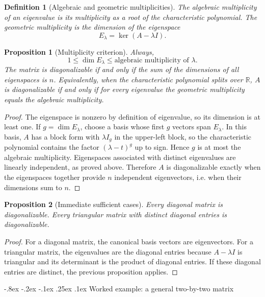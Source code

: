 \documentclass[10pt]{article}
\makeatletter
\renewcommand\subsubsection{\@startsection{subsubsection}{3}{\z@}%
  {-.8ex \@plus -.2ex \@minus -.1ex}%
  {.25ex \@plus .1ex}%
  {\normalfont\normalsize\bfseries\itshape}}
\theoremstyle{compactdefinition}
\newtheorem{definition}{Definition}[section]
\theoremstyle{compactproposition}
\newtheorem{proposition}{Proposition}[section]
\newcommand{\R}{\mathbb{R}}
\makeatother
\begin{document}
\begin{definition}[Algebraic and geometric multiplicities]
The algebraic multiplicity of an eigenvalue is its multiplicity as a root of
the characteristic polynomial. The geometric multiplicity is the dimension of
the eigenspace
\[
E_\lambda=\ker(A-\lambda I).
\]
\end{definition}

\begin{proposition}[Multiplicity criterion]
Always,
\[
1\le \dim E_\lambda\le \text{algebraic multiplicity of }\lambda.
\]
The matrix is diagonalizable if and only if the sum of the dimensions of all
eigenspaces is $n$. Equivalently, when the characteristic polynomial splits
over $\R$, $A$ is diagonalizable if and only if for every eigenvalue the
geometric multiplicity equals the algebraic multiplicity.
\end{proposition}

\begin{proof}
The eigenspace is nonzero by definition of eigenvalue, so its dimension is at
least one. If $g=\dim E_\lambda$, choose a basis whose first $g$ vectors span
$E_\lambda$. In this basis, $A$ has a block form with $\lambda I_g$ in the
upper-left block, so the characteristic polynomial contains the factor
$(\lambda-t)^g$ up to sign. Hence $g$ is at most the algebraic multiplicity.
Eigenspaces associated with distinct eigenvalues are linearly independent, as
proved above. Therefore $A$ is diagonalizable exactly when the eigenspaces
together provide $n$ independent eigenvectors, i.e. when their dimensions sum
to $n$.
\end{proof}

\begin{proposition}[Immediate sufficient cases]
Every diagonal matrix is diagonalizable. Every triangular matrix with distinct
diagonal entries is diagonalizable.
\end{proposition}

\begin{proof}
For a diagonal matrix, the canonical basis vectors are eigenvectors. For a
triangular matrix, the eigenvalues are the diagonal entries because
$A-\lambda I$ is triangular and its determinant is the product of diagonal
entries. If these diagonal entries are distinct, the previous proposition
applies.
\end{proof}

\subsubsection{Worked example: a general two-by-two matrix}
\end{document}
